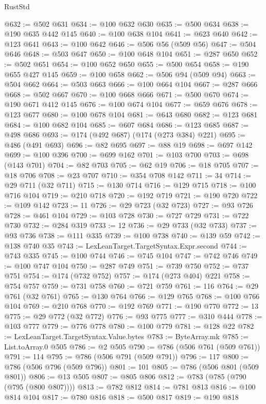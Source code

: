 \begin{lexlean}{RustStd}
\begin{coremodule}
{\begin{coremodule}
{{{{{{{{{{{{{{{{{{{{{{{{{{{{{{{{{{{{{{{{{{{{{{{{{{{{{{{@632 := @502 @631
@634 := @100 @632 @630
@635 := @500 @634
@638 := @190 @635 @442 @145
@640 := @100 @638 @104
@641 := @623 @640
@642 := @123 @641
@643 := @100 @642
@646 := @506 @56 (@509 @56)
@647 := @504 @646
@648 := @503 @647
@650 := @100 @648 @104
@651 := @287 @650
@652 := @502 @651
@654 := @100 @652 @650
@655 := @500 @654
@658 := @190 @655 @427 @145
@659 := @100 @658
@662 := @506 @94 (@509 @94)
@663 := @504 @662
@664 := @503 @663
@666 := @100 @664 @104
@667 := @287 @666
@668 := @502 @667
@670 := @100 @668 @666
@671 := @500 @670
@674 := @190 @671 @412 @145
@676 := @100 @674 @104
@677 := @659 @676
@678 := @123 @677
@680 := @100 @678 @104
@681 := @643 @680
@682 := @123 @681
@684 := @100 @682 @104
@685 := @607 @684
@686 := @123 @685
@687 := @498 @686
@693 := @174 (@492 @687) (@174 (@273 @384) @221)
@695 := @486 (@491 @693)
@696 := @82 @695
@697 := @88 @19
@698 := @697 @142
@699 := @100 @396
@700 := @699 @162
@701 := @103 @700
@703 := @698 (@143 @701)
@704 := @82 @703
@705 := @62 @19
@706 := @18 @705
@707 := @18 @706
@708 := @23 @707
@710 := @354 @708 @142
@711 := 34
@714 := @29 @711 (@32 @711)
@715 := @130 @714
@716 := @129 @715
@718 := @100 @716 @104
@719 := @210 @718
@720 := @192 @719
@721 := @190 @720
@722 := @109 @142
@723 := 11
@726 := @29 @723 (@32 @723)
@727 := @93 @726
@728 := @461 @104
@729 := @103 @728
@730 := @727 @729
@731 := @722 @730
@732 := @284 @319
@733 := 12
@736 := @29 @733 (@32 @733)
@737 := @93 @736
@738 := @111 @335
@739 := @100 @738
@740 := @139 @59
@742 := @138 @740 @35
@743 := LexLeanTarget.TargetSyntax.Expr.second
@744 := @743 @335
@745 := @100 @744
@746 := @745 @104
@747 := @742 @746
@749 := @100 @747 @104
@750 := @287 @749
@751 := @739 @750
@752 := @737 @751
@754 := @174 (@732 @752)
@757 := @174 (@273 @404) @221
@758 := @754 @757
@759 := @731 @758
@760 := @721 @759
@761 := 116
@764 := @29 @761 (@32 @761)
@765 := @130 @764
@766 := @129 @765
@768 := @100 @766 @104
@769 := @210 @768
@770 := @192 @769
@771 := @190 @770
@772 := 13
@775 := @29 @772 (@32 @772)
@776 := @93 @775
@777 := @310 @444
@778 := @103 @777
@779 := @776 @778
@780 := @100 @779
@781 := @128 @22
@782 := LexLeanTarget.TargetSyntax.Value.bytes
@783 := ByteArray.mk
@785 := List.toArray.{0} @505
@786 := @2 @505
@790 := @786 (@506 @761 (@509 @761))
@791 := 114
@795 := @786 (@506 @791 (@509 @791))
@796 := 117
@800 := @786 (@506 @796 (@509 @796))
@801 := 101
@805 := @786 (@506 @801 (@509 @801))
@806 := @13 @505
@807 := @805 @806
@812 := @783 (@785 (@790 (@795 (@800 @807))))
@813 := @782 @812
@814 := @781 @813
@816 := @100 @814 @104
@817 := @780 @816
@818 := @500 @817
@819 := @190 @818
}}}}}}}}}}}}}}}}}}}}}}}}}}}}}}}}}}}}}}}}}}}}}}}}}}}}}}}
\end{coremodule}}
\end{coremodule}
\end{lexlean}
